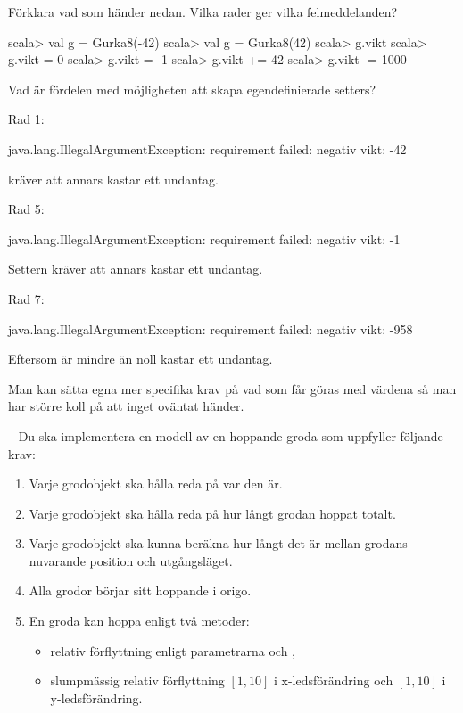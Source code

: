 \Subtask Förklara vad som händer nedan. Vilka rader ger vilka felmeddelanden?
\begin{REPL}
scala> val g = Gurka8(-42)
scala> val g = Gurka8(42)
scala> g.vikt
scala> g.vikt = 0
scala> g.vikt = -1
scala> g.vikt += 42
scala> g.vikt -= 1000
\end{REPL}

\Subtask Vad är fördelen med möjligheten att skapa egendefinierade setters?

\SOLUTION


\TaskSolved \what


\SubtaskSolved

Rad 1:
\begin{REPL}
	java.lang.IllegalArgumentException: requirement failed: negativ vikt: -42
\end{REPL}
 kräver att  annars kastar  ett undantag.

Rad 5:
\begin{REPL}
	java.lang.IllegalArgumentException: requirement failed: negativ vikt: -1
\end{REPL}
Settern  kräver att  annars kastar  ett undantag.

Rad 7:
\begin{REPL}
	java.lang.IllegalArgumentException: requirement failed: negativ vikt: -958
\end{REPL}
Eftersom  är mindre än noll kastar  ett undantag.

\SubtaskSolved  Man kan sätta egna mer specifika krav på vad som får göras med värdena så man har större koll på att inget oväntat händer.

\QUESTEND





\QUESTBEGIN

\Task  \what~  Du ska implementera en modell av en hoppande groda som uppfyller följande krav:
\begin{enumerate}%
\item Varje grodobjekt ska hålla reda på var den är.
\item Varje grodobjekt ska hålla reda på hur långt grodan hoppat totalt.
\item Varje grodobjekt ska kunna beräkna hur långt det är mellan grodans nuvarande position och utgångsläget.
\item Alla grodor börjar sitt hoppande i origo.
\item En groda kan hoppa enligt två metoder:
  \begin{itemize} [nolistsep, noitemsep]
  \item relativ förflyttning enligt parametrarna  och ,
  \item slumpmässig relativ förflyttning $[1, 10]$ i x-ledsförändring och $[1, 10]$ i y-ledsförändring.
  \end{itemize}
\end{enumerate}

